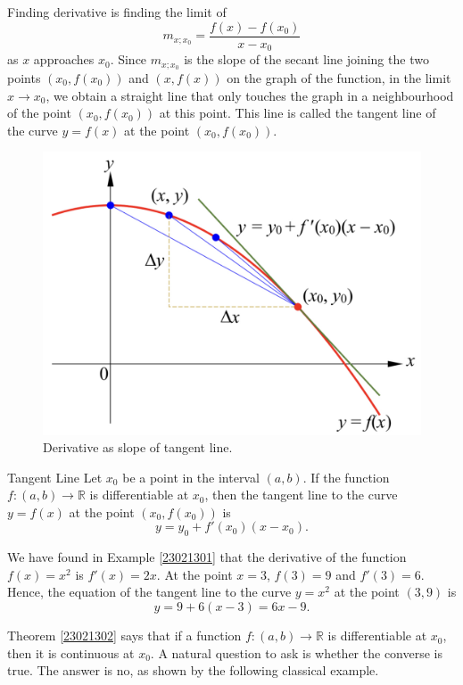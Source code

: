  Finding derivative is finding the limit of 
\[m_{x;x_0}=\frac{f(x)-f(x_0)}{x-x_0}\] as $x$ approaches $x_0$. Since $m_{x;x_0}$ is the slope of the secant line joining the two points $(x_0, f(x_0))$ and $(x,f(x))$ on the graph of the function, in the limit $x\to x_0$, we obtain a straight line that only touches the graph in a neighbourhood of the point $(x_0, f(x_0))$ at this point. This line is called the tangent line of the curve $y=f(x)$ at the point $(x_0, f(x_0))$.

 \begin{figure}[ht]
\centering
\includegraphics[scale=0.2]{Picture18.png}
\caption{  Derivative as slope of tangent line. \fa}\label{figure18}
\end{figure}

\begin{definition}{Tangent Line}
Let $x_0$ be a point in the interval $(a,b)$. If the function $f:(a,b)\to\mathbb{R}$ is  differentiable at $x_0$, then the tangent line to the curve $y=f(x)$ at the point $(x_0, f(x_0))$ is
\[y=y_0+f'(x_0)(x-x_0).\]
\end{definition}


\begin{example}{}
We have found in Example \ref{23021301} that the derivative of the function $f(x)=x^2$ is $f'(x)=2x$. At the point $x=3$, $f(3)=9$ and $f'(3)=6$. Hence, the equation of the tangent line to the curve $y=x^2$ at the point $(3,9)$ is
\[y=9+6(x-3)=6x-9.\]
\end{example}

Theorem \ref{23021302} says that if a function $f:(a,b)\to \mathbb{R}$ is differentiable at $x_0$, then it is continuous at $x_0$. A natural question to ask is whether the converse is true. The answer is no, as shown by the following classical example.

